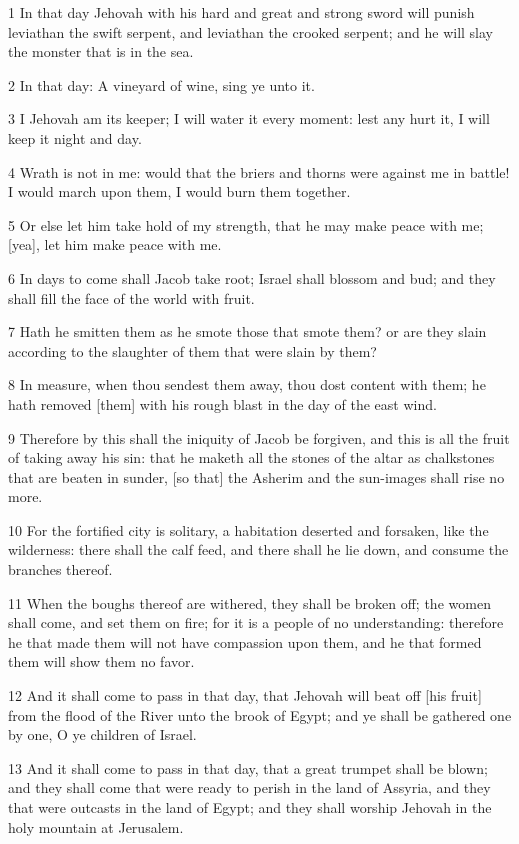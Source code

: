 \par 1 In that day Jehovah with his hard and great and strong sword will punish leviathan the swift serpent, and leviathan the crooked serpent; and he will slay the monster that is in the sea.
\par 2 In that day: A vineyard of wine, sing ye unto it.
\par 3 I Jehovah am its keeper; I will water it every moment: lest any hurt it, I will keep it night and day.
\par 4 Wrath is not in me: would that the briers and thorns were against me in battle! I would march upon them, I would burn them together.
\par 5 Or else let him take hold of my strength, that he may make peace with me; [yea], let him make peace with me.
\par 6 In days to come shall Jacob take root; Israel shall blossom and bud; and they shall fill the face of the world with fruit.
\par 7 Hath he smitten them as he smote those that smote them? or are they slain according to the slaughter of them that were slain by them?
\par 8 In measure, when thou sendest them away, thou dost content with them; he hath removed [them] with his rough blast in the day of the east wind.
\par 9 Therefore by this shall the iniquity of Jacob be forgiven, and this is all the fruit of taking away his sin: that he maketh all the stones of the altar as chalkstones that are beaten in sunder, [so that] the Asherim and the sun-images shall rise no more.
\par 10 For the fortified city is solitary, a habitation deserted and forsaken, like the wilderness: there shall the calf feed, and there shall he lie down, and consume the branches thereof.
\par 11 When the boughs thereof are withered, they shall be broken off; the women shall come, and set them on fire; for it is a people of no understanding: therefore he that made them will not have compassion upon them, and he that formed them will show them no favor.
\par 12 And it shall come to pass in that day, that Jehovah will beat off [his fruit] from the flood of the River unto the brook of Egypt; and ye shall be gathered one by one, O ye children of Israel.
\par 13 And it shall come to pass in that day, that a great trumpet shall be blown; and they shall come that were ready to perish in the land of Assyria, and they that were outcasts in the land of Egypt; and they shall worship Jehovah in the holy mountain at Jerusalem.

